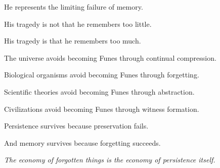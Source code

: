 \documentclass[12pt,oneside]{book}
\theoremstyle{plain} \newtheorem{theorem}{Theorem}[chapter] \newtheorem{lemma}[theorem]{Lemma} \newtheorem{proposition}[theorem]{Proposition} \newtheorem{corollary}[theorem]{Corollary}
\theoremstyle{definition} \newtheorem{definition}[theorem]{Definition} \newtheorem{axiom}[theorem]{Axiom} \newtheorem{construction}[theorem]{Construction}
\theoremstyle{remark} \newtheorem{remark}[theorem]{Remark} \newtheorem{example}[theorem]{Example}
\begin{document}
He represents the limiting failure of memory.

His tragedy is not that he remembers too little.

His tragedy is that he remembers too much.

The universe avoids becoming Funes through continual compression.

Biological organisms avoid becoming Funes through forgetting.

Scientific theories avoid becoming Funes through abstraction.

Civilizations avoid becoming Funes through witness formation.

Persistence survives because preservation fails.

And memory survives because forgetting succeeds.

\bigskip

\begin{center}
\Large
\emph{
The economy of forgotten things is the economy of persistence itself.
}
\end{center}

\newpage
\end{document}
